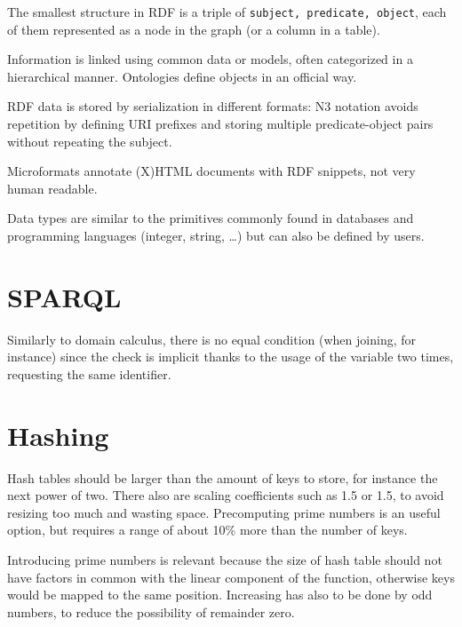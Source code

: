The smallest structure in RDF is a triple of \texttt{subject, predicate, object}, each of them represented as a node in the graph (or a column in a table). 

Information is linked using common data or models, often categorized in a hierarchical manner. Ontologies define objects in an official way.

RDF data is stored by serialization in different formats: N3 notation avoids repetition by defining URI prefixes and storing multiple predicate-object pairs without repeating the subject.

Microformats annotate (X)HTML documents with RDF snippets, not very human readable. 

Data types are similar to the primitives commonly found in databases and programming languages (integer, string, \dots) but can also be defined by users. 



\section{SPARQL}
Similarly to domain calculus, there is no equal condition (when joining, for instance) since the check is implicit thanks to the usage of the variable two times, requesting the same identifier. 


\section{Hashing}
Hash tables should be larger than the amount of keys to store, for instance the next power of two. There also are scaling coefficients such as 1.5 or 1.5, to avoid resizing too much and wasting space. Precomputing prime numbers is an useful option, but requires a range of about 10\% more than the number of keys. 

Introducing prime numbers is relevant because the size of hash table should not have factors in common with the linear component of the function, otherwise keys would be mapped to the same position. Increasing has also to be done by odd numbers, to reduce the possibility of remainder zero. 

